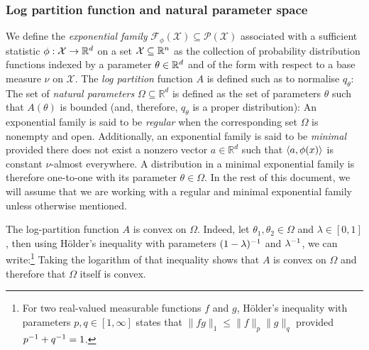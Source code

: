 

\subsubsection*{Log partition function and natural parameter space
}
We define the \emph{exponential family} $\mathcal F_\phi(\mathcal X)\subseteq\mathcal P(\mathcal X)$ associated with a sufficient statistic $\phi:\mathcal X\to\mathbb R^{d}$ on a set $\mathcal X\subseteq \mathbb R^{n}$ as the collection of probability distribution functions indexed by a parameter $\theta\in\mathbb R^{d}$ and of the form
%
%
with respect to a base measure $\nu$ on $\mathcal X$. The \emph{log partition} function $A$ is defined such as to normalise $q_{\theta}$:
%
%
The set of \emph{natural parameters} $\Omega \subseteq \mathbb R^{d}$ is defined as the set of parameters $\theta$ such that $A(\theta)$ is bounded (and, therefore, $q_\theta$ is a proper distribution):
%
An exponential family is said to be \emph{regular} when the corresponding set $\Omega$ is nonempty and open. Additionally, an exponential family is said to be \emph{minimal} provided there does not exist a nonzero vector $a\in\mathbb R^{d}$ such that $\left\langle a,\phi(x) \right\rangle$ is constant $\nu$-almost everywhere. A distribution in a minimal exponential family is therefore one-to-one with its parameter $\theta\in\Omega$. In the rest of this document, we will assume that we are working with a regular and minimal exponential family unless otherwise mentioned.

The log-partition function $A$ is convex on $\Omega$. Indeed, let $\theta_1,\theta_2\in\Omega$ and $\lambda\in[0,1]$, then using H\"older's inequality with parameters $(1-\lambda)^{-1}$ and $\lambda^{-1}$, we can write:\footnote{For two real-valued measurable functions $f$ and $g$, H\"older's inequality with parameters $p,q\in[1,\infty]$ states that $\|fg\|_{1}\le \|f\|_{p}\|g\|_{q}$ provided $p^{-1}+q^{-1}=1$.}
Taking the logarithm of that inequality shows that $A$ is convex on $\Omega$ and therefore that $\Omega$ itself is convex.
%
